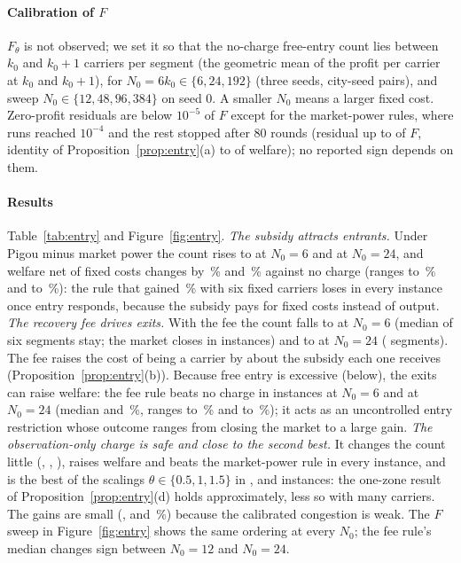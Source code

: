 \paragraph{Calibration of $F$} $F_\theta$ is not observed; we set it so that the no-charge free-entry count lies between $k_0$ and $k_0+1$ carriers per segment (the geometric mean of the profit per carrier at $k_0$ and $k_0+1$), for $N_0=6k_0\in\{6,24,192\}$ (three seeds, \EntInst{} city-seed pairs), and sweep $N_0\in\{12,48,96,384\}$ on seed 0. A smaller $N_0$ means a larger fixed cost. Zero-profit residuals are below $10^{-5}$ of $F$ except for the market-power rules, where \EntConv{} runs reached $10^{-4}$ and the rest stopped after 80 rounds (residual up to \EntErrMax{} of $F$, identity of Proposition~\ref{prop:entry}(a) to \EntIdErr{} of welfare); no reported sign depends on them.



\paragraph{Results} Table~\ref{tab:entry} and Figure~\ref{fig:entry}. \emph{The subsidy attracts entrants.} Under Pigou minus market power the count rises to \EntSixPmN{} at $N_0=6$ and \EntTwentyFourPmN{} at $N_0=24$, and welfare net of fixed costs changes by \EntSixPmdSW\,\% and \EntTwentyFourPmdSW\,\% against no charge (ranges \EntSixPmdSWMin{} to \EntSixPmdSWMax\,\% and \EntTwentyFourPmdSWMin{} to \EntTwentyFourPmdSWMax\,\%): the rule that gained \WSixPmdSW\,\% with six fixed carriers loses in every instance once entry responds, because the subsidy pays for fixed costs instead of output. \emph{The recovery fee drives exits.} With the fee the count falls to \EntSixPmfeeN{} at $N_0=6$ (median \EntSixPmfeeAct{} of six segments stay; the market closes in \EntSixPmfeeClosed{} instances) and to \EntTwentyFourPmfeeN{} at $N_0=24$ (\EntTwentyFourPmfeeAct{} segments). The fee raises the cost of being a carrier by about the subsidy each one receives (Proposition~\ref{prop:entry}(b)). Because free entry is excessive (below), the exits can raise welfare: the fee rule beats no charge in \EntSixPmfeeBeatsNone{} instances at $N_0=6$ and \EntTwentyFourPmfeeBeatsNone{} at $N_0=24$ (median \EntSixPmfeedSW{} and \EntTwentyFourPmfeedSW\,\%, ranges \EntSixPmfeedSWMin{} to \EntSixPmfeedSWMax\,\% and \EntTwentyFourPmfeedSWMin{} to \EntTwentyFourPmfeedSWMax\,\%); it acts as an uncontrolled entry restriction whose outcome ranges from closing the market to a large gain. \emph{The observation-only charge is safe and close to the second best.} It changes the count little (\EntSixObsN, \EntTwentyFourObsN, \EntOneNinetyTwoObsN), raises welfare and beats the market-power rule in every instance, and is the best of the scalings $\theta\in\{0.5,1,1.5\}$ in \EntSixObsBest, \EntTwentyFourObsBest{} and \EntOneNinetyTwoObsBest{} instances: the one-zone result of Proposition~\ref{prop:entry}(d) holds approximately, less so with many carriers. The gains are small (\EntSixObsdSW, \EntTwentyFourObsdSW{} and \EntOneNinetyTwoObsdSW\,\%) because the calibrated congestion is weak. The $F$ sweep in Figure~\ref{fig:entry} shows the same ordering at every $N_0$; the fee rule's median changes sign between $N_0=12$ and $N_0=24$.

